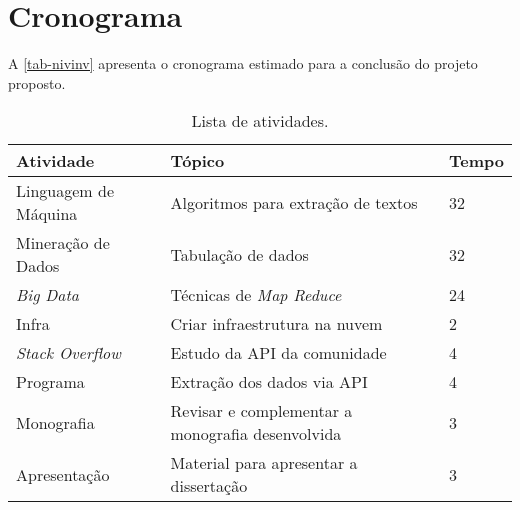 \chapter{Cronograma}

A \autoref{tab-nivinv} apresenta o cronograma estimado para a conclusão do projeto proposto.

\begin{table}[htb]
\ABNTEXfontereduzida
\caption[Cronograma]{Lista de atividades.}
\label{tab-nivinv}
\begin{tabular}{p{3.75cm}|p{9.0cm}|p{1.5cm}}
   \textbf{Atividade} & \textbf{Tópico}  & \textbf{Tempo}  \\
    \hline
    Linguagem de Máquina & Algoritmos para extração de textos & 32 \\
    \hline
    Mineração de Dados & Tabulação de dados & 32  \\
    \hline
    \textit{Big Data} & Técnicas de \textit{Map Reduce} & 24  \\
	\hline
    Infra & Criar infraestrutura na nuvem & 2  \\
    \hline
    \textit{Stack Overflow} & Estudo da API da comunidade & 4  \\
    \hline
    Programa & Extração dos dados via API & 4  \\    
    \hline
    Monografia & Revisar e complementar a monografia desenvolvida & 3  \\    
     \hline
    Apresentação & Material para apresentar a dissertação & 3  \\        
\end{tabular}
\end{table}





